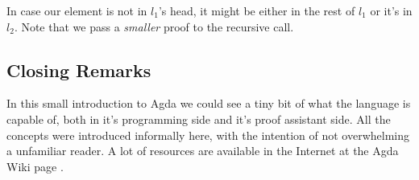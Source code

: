 
In case our element is not in $l_1$'s head, it might be either in the rest of $l_1$ or it's in $l_2$.
Note that we pass a \emph{smaller} proof to the recursive call.

\subsection{Closing Remarks}

In this small introduction to Agda we could see a tiny bit of what the language is capable of,
both in it's programming side and it's proof assistant side. All the concepts were introduced
informally here, with the intention of not overwhelming a unfamiliar reader. A lot of resources
are available in the Internet at the Agda Wiki page \cite{AgdaTutorials}. 



